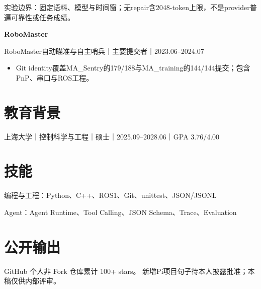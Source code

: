 \documentclass[10pt,a4paper,UTF8,fontset=fandol]{ctexart}
\begin{document}
{\color{muted}\fontsize{8.5}{10.4}\selectfont 实验边界：固定语料、模型与时间窗；无repair含2048-token上限，不是provider普遍可靠性或任务成绩。\par}
\vspace{0.6em}
{\bfseries\color{navy}RoboMaster}\par
{\color{muted}\fontsize{8.8}{10.8}\selectfont RoboMaster自动瞄准与自主哨兵｜主要提交者｜2023.06--2024.07}\par
\begin{itemize}
\item Git identity覆盖MA\_Sentry的179/188与MA\_training的144/144提交；包含PnP、串口与ROS工程。
\end{itemize}
\vspace{0.6em}
\section{教育背景}
上海大学｜控制科学与工程｜硕士｜2025.09--2028.06｜GPA 3.76/4.00
\section{技能}
编程与工程：Python、C++、ROS1、Git、unittest、JSON/JSONL\par
Agent：Agent Runtime、Tool Calling、JSON Schema、Trace、Evaluation\par
\section{公开输出}
GitHub 个人非 Fork 仓库累计 100+ stars。
\vfill{\color{muted}\fontsize{8.5}{10}\selectfont 新增Pi项目句子待本人披露批准；本稿仅供内部评审。}
\end{document}
